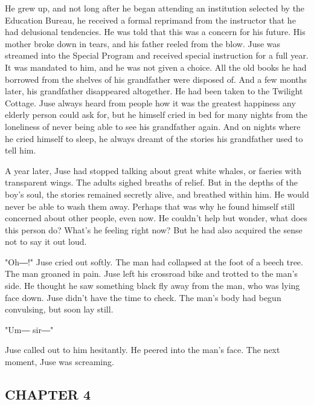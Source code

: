 He grew up, and not long after he began attending an institution
selected by the Education Bureau, he received a formal reprimand from
the instructor that he had delusional tendencies. He was told that this
was a concern for his future. His mother broke down in tears, and his
father reeled from the blow. Juse was streamed into the Special Program
and received special instruction for a full year. It was mandated to
him, and he was not given a choice. All the old books he had borrowed
from the shelves of his grandfather were disposed of. And a few months
later, his grandfather disappeared altogether. He had been taken to the
Twilight Cottage. Juse always heard from people how it was the greatest
happiness any elderly person could ask for, but he himself cried in bed
for many nights from the loneliness of never being able to see his
grandfather again. And on nights where he cried himself to sleep, he
always dreamt of the stories his grandfather used to tell him.~

A year later, Juse had stopped talking about great white whales, or
faeries with transparent wings. The adults sighed breaths of relief. But
in the depths of the boy's soul, the stories remained secretly alive,
and breathed within him. He would never be able to wash them away.
Perhaps that was why he found himself still concerned about other
people, even now. He couldn't help but wonder, what does this person do?
What's he feeling right now? But he had also acquired the sense not to
say it out loud.

"Oh―!" Juse cried out softly. The man had collapsed at the foot of a
beech tree. The man groaned in pain. Juse left his crossroad bike and
trotted to the man's side. He thought he saw something black fly away
from the man, who was lying face down. Juse didn't have the time to
check. The man's body had begun convulsing, but soon lay still.

"Um― sir―"

Juse called out to him hesitantly. He peered into the man's face. The
next moment, Juse was screaming.

\hypertarget{index_split_065.htmlux5cux23calibre_pb_90}{}

\protect\hypertarget{index_split_088.html}{}{}

\hypertarget{index_split_088.htmlux5cux23calibre_pb_0}{}

\hypertarget{index_split_088.htmlux5cux23calibre_toc_5}{%
\subsection{CHAPTER 4}\label{index_split_088.htmlux5cux23calibre_toc_5}}

